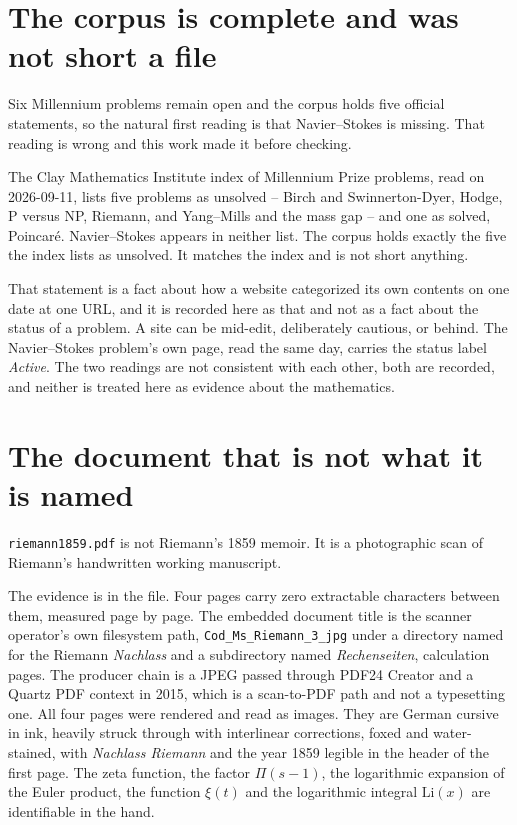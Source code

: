 \section{The corpus is complete and was not short a file}

Six Millennium problems remain open and the corpus holds five official statements, so the natural
first reading is that Navier--Stokes is missing. That reading is wrong and this work made it before
checking.

The Clay Mathematics Institute index of Millennium Prize problems, read on 2026-09-11, lists five
problems as unsolved -- Birch and Swinnerton-Dyer, Hodge, P versus NP, Riemann, and Yang--Mills and
the mass gap -- and one as solved, Poincar\'e. Navier--Stokes appears in neither list. The corpus
holds exactly the five the index lists as unsolved. It matches the index and is not short anything.

That statement is a fact about how a website categorized its own contents on one date at one URL,
and it is recorded here as that and not as a fact about the status of a problem. A site can be
mid-edit, deliberately cautious, or behind. The Navier--Stokes problem's own page, read the same
day, carries the status label \emph{Active}. The two readings are not consistent with each other,
both are recorded, and neither is treated here as evidence about the mathematics.

\section{The document that is not what it is named}

\texttt{riemann1859.pdf} is not Riemann's 1859 memoir. It is a photographic scan of Riemann's
handwritten working manuscript.

The evidence is in the file. Four pages carry zero extractable characters between them, measured
page by page. The embedded document title is the scanner operator's own filesystem path,
\texttt{Cod\_\allowbreak{}Ms\_\allowbreak{}Riemann\_\allowbreak{}3\_\allowbreak{}jpg} under a
directory named for the Riemann \emph{Nachlass} and a subdirectory named
\emph{Rechenseiten}, calculation pages. The producer chain is a JPEG passed through PDF24 Creator
and a Quartz PDF context in 2015, which is a scan-to-PDF path and not a typesetting one. All four
pages were rendered and read as images. They are German cursive in ink, heavily struck through with
interlinear corrections, foxed and water-stained, with \emph{Nachlass Riemann} and the year 1859
legible in the header of the first page. The zeta function, the factor $\Pi(s-1)$, the logarithmic
expansion of the Euler product, the function $\xi(t)$ and the logarithmic integral $\mathrm{Li}(x)$
are identifiable in the hand.

